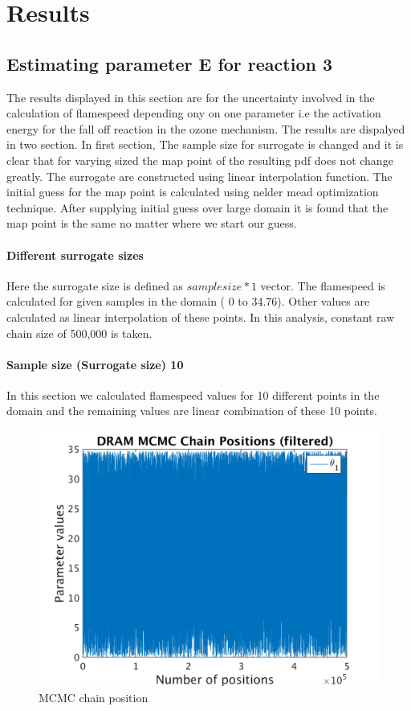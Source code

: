 \chapter{Results}

\section{Estimating parameter E for reaction 3}

The results displayed in this section are for the uncertainty involved in the calculation of flamespeed depending ony on one parameter i.e the activation energy for the fall off reaction in the ozone mechanism. The results are dispalyed in two section. In first section, The sample size for surrogate is changed and it is clear that for varying sized the map point of the resulting pdf does not change greatly. The surrogate are constructed using linear interpolation function. The initial guess for the map point is calculated using nelder mead optimization technique. After supplying initial guess over large domain it is found that the map point is the same no matter where we start our guess. 
\bigskip

\subsubsection{Different surrogate sizes }

\noindent Here the surrogate size is defined as $sample size*1$ vector. The flamespeed is calculated for given samples in the domain ( 0 to 34.76). Other values are calculated as linear interpolation of these points. In this analysis, constant raw chain size of 500,000 is taken. 
\subsubsection{Sample size (Surrogate size) 10 }
In this section we calculated flamespeed values for 10 different points in the domain and the remaining values are linear combination of these 10 points.  
\begin{figure}[h!]
  
  \centering
   \includegraphics[scale=0.75]{output_10/simple_ip_chain_pos_filt}
   \caption{MCMC chain position }
\end{figure}


